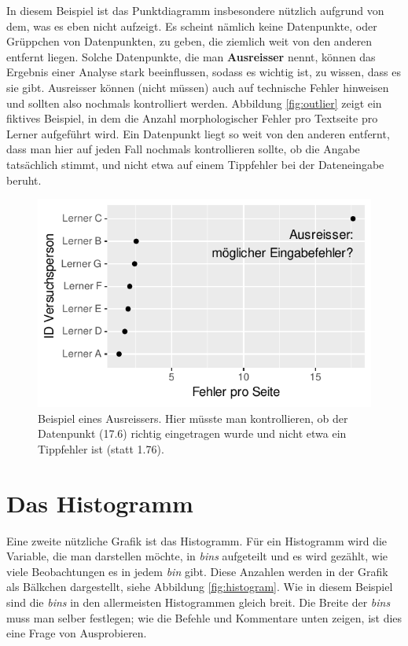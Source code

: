 \documentclass[oneside, 10pt]{book}\usepackage[]{graphicx}\usepackage[]{xcolor}
\newenvironment{knitrout}{}{} %
\begin{document}
In diesem Beispiel ist das Punktdiagramm insbesondere nützlich
aufgrund von dem, was es eben nicht aufzeigt. Es scheint
nämlich keine Datenpunkte, oder Grüppchen von Datenpunkten, zu geben,
die ziemlich weit von den anderen entfernt liegen. Solche Datenpunkte,
die man \textbf{Ausreisser} nennt, können das Ergebnis einer Analyse
stark beeinflussen, sodass es wichtig ist, zu wissen, dass es sie gibt.
Ausreisser können (nicht müssen) auch auf technische
Fehler hinweisen und sollten also nochmals kontrolliert werden.
Abbildung \ref{fig:outlier} zeigt ein fiktives Beispiel, in dem
die Anzahl morphologischer Fehler pro Textseite pro Lerner aufgeführt wird.
Ein Datenpunkt liegt so weit von den anderen entfernt, dass man hier
auf jeden Fall nochmals kontrollieren sollte, ob die Angabe tatsächlich stimmt,
und nicht etwa auf einem Tippfehler bei der Dateneingabe beruht.
\begin{knitrout}
\color{fgcolor}\begin{figure}[tp]

{\centering \includegraphics[width=.5\textwidth]{figs/unnamed-chunk-82-1} 

}

\caption{Beispiel eines Ausreissers. Hier müsste man kontrollieren, ob der Datenpunkt (17.6) richtig eingetragen wurde und nicht etwa ein Tippfehler ist (statt 1.76).\label{fig:outlier}}\label{fig:unnamed-chunk-82}
\end{figure}

\end{knitrout}

\section{Das Histogramm}\label{sec:histogram}
Eine zweite nützliche Grafik ist das Histogramm.
Für ein Histogramm wird die Variable, die man darstellen
möchte, in \textit{bins} aufgeteilt und es wird gezählt,
wie viele Beobachtungen es in jedem \textit{bin} gibt.
Diese Anzahlen werden in der Grafik als Bälkchen dargestellt,
siehe Abbildung \ref{fig:histogram}.
Wie in diesem Beispiel sind die \textit{bins}
in den allermeisten Histogrammen gleich breit.
Die Breite der \textit{bins} muss man selber festlegen;
wie die Befehle und Kommentare unten zeigen, ist dies
eine Frage von Ausprobieren.
\end{document}
